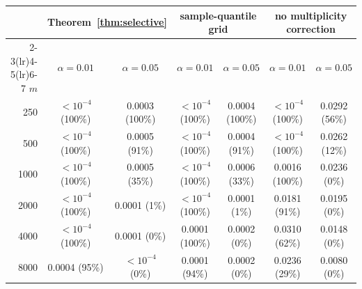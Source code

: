 \begin{tabular}{rcccccc}
\toprule
 & \multicolumn{2}{c}{Theorem~\ref{thm:selective}} & \multicolumn{2}{c}{sample-quantile grid} & \multicolumn{2}{c}{no multiplicity correction} \\
\cmidrule(lr){2-3}\cmidrule(lr){4-5}\cmidrule(lr){6-7}
$m$ & $\alpha=0.01$ & $\alpha=0.05$ & $\alpha=0.01$ & $\alpha=0.05$ & $\alpha=0.01$ & $\alpha=0.05$ \\
\midrule
250 & $<\!10^{-4}$ (100\%) & 0.0003 (100\%) & $<\!10^{-4}$ (100\%) & 0.0004 (100\%) & $<\!10^{-4}$ (100\%) & 0.0292 (56\%) \\
500 & $<\!10^{-4}$ (100\%) & 0.0005 (91\%) & $<\!10^{-4}$ (100\%) & 0.0004 (91\%) & $<\!10^{-4}$ (100\%) & 0.0262 (12\%) \\
1000 & $<\!10^{-4}$ (100\%) & 0.0005 (35\%) & $<\!10^{-4}$ (100\%) & 0.0006 (33\%) & 0.0016 (100\%) & 0.0236 (0\%) \\
2000 & $<\!10^{-4}$ (100\%) & 0.0001 (1\%) & $<\!10^{-4}$ (100\%) & 0.0001 (1\%) & 0.0181 (91\%) & 0.0195 (0\%) \\
4000 & $<\!10^{-4}$ (100\%) & 0.0001 (0\%) & 0.0001 (100\%) & 0.0002 (0\%) & 0.0310 (62\%) & 0.0148 (0\%) \\
8000 & 0.0004 (95\%) & $<\!10^{-4}$ (0\%) & 0.0001 (94\%) & 0.0002 (0\%) & 0.0236 (29\%) & 0.0080 (0\%) \\
\bottomrule
\end{tabular}
